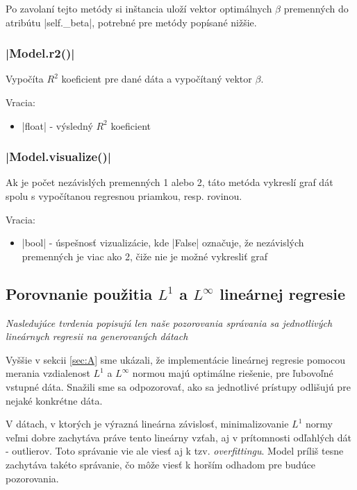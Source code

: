 \documentclass[report.tex]{subfiles}
\begin{document}
Po zavolaní tejto metódy si inštancia uloží vektor optimálnych $\beta$ premenných do atribútu \pyth|self._beta|, potrebné pre metódy popísané nižšie.

\subsubsection*{\pyth|Model.r2()|}

Vypočíta $R^2$ koeficient pre dané dáta a vypočítaný vektor $\beta$.

Vracia:

\begin{itemize}
	\item \pyth|float| - výsledný $R^2$ koeficient
\end{itemize}

\subsubsection*{\pyth|Model.visualize()|}

Ak je počet nezávislých premenných 1 alebo 2, táto metóda vykreslí graf dát spolu s vypočítanou regresnou priamkou, resp. rovinou. 

Vracia:

\begin{itemize}
	\item \pyth|bool| - úspešnosť vizualizácie, kde \pyth|False| označuje, že nezávislých premenných je viac ako 2, čiže nie je možné vykresliť graf
\end{itemize}

\subsection{Porovnanie použitia $L^1$ a $L^{\infty}$ lineárnej regresie}

\textit{Nasledujúce tvrdenia popisujú len naše pozorovania správania sa jednotlivých lineárnych regresii na generovaných dátach}

Vyššie v sekcii \ref{sec:A} sme ukázali, že implementácie lineárnej regresie pomocou merania vzdialenost $L^1$ a $L^{\infty}$ normou majú optimálne riešenie, pre ľubovoľné vstupné dáta. Snažili sme sa odpozorovať, ako sa jednotlivé prístupy odlišujú pre nejaké konkrétne dáta.

V dátach, v ktorých je výrazná lineárna závislosť, minimalizovanie $L^1$ normy veľmi dobre zachytáva práve tento lineárny vzťah, aj v prítomnosti odľahlých dát - outlierov. Toto správanie vie ale viesť aj k tzv. \textit{overfittingu}. Model príliš tesne zachytáva takéto správanie, čo môže viesť k horším odhadom pre budúce pozorovania.
\end{document}
